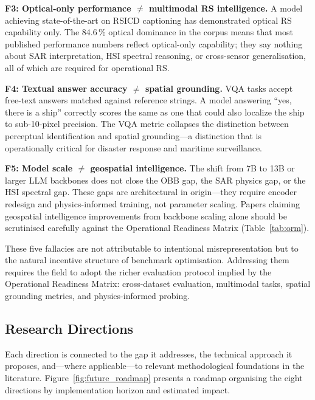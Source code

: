 \textbf{F3: Optical-only performance $\neq$ multimodal RS intelligence.}
A model achieving state-of-the-art on RSICD captioning has demonstrated optical
RS capability only. The 84.6\,\% optical dominance in the corpus means that most
published performance numbers reflect optical-only capability; they say nothing
about SAR interpretation, HSI spectral reasoning, or cross-sensor generalisation,
all of which are required for operational RS.

\textbf{F4: Textual answer accuracy $\neq$ spatial grounding.}
VQA tasks accept free-text answers matched against reference strings.
A model answering ``yes, there is a ship'' correctly scores the same as one that
could also localize the ship to sub-10-pixel precision. The VQA metric collapses
the distinction between perceptual identification and spatial grounding---a
distinction that is operationally critical for disaster response and maritime
surveillance.

\textbf{F5: Model scale $\neq$ geospatial intelligence.}
The shift from 7B to 13B or larger LLM backbones does not close the OBB gap,
the SAR physics gap, or the HSI spectral gap. These gaps are architectural in
origin---they require encoder redesign and physics-informed training, not parameter
scaling. Papers claiming geospatial intelligence improvements from backbone scaling
alone should be scrutinised carefully against the Operational Readiness Matrix
(Table~\ref{tab:orm}).

These five fallacies are not attributable to intentional misrepresentation but
to the natural incentive structure of benchmark optimisation. Addressing them
requires the field to adopt the richer evaluation protocol implied by the
Operational Readiness Matrix: cross-dataset evaluation, multimodal tasks,
spatial grounding metrics, and physics-informed probing.

\subsection{Research Directions}\label{sec9:directions}

Each direction is connected to the gap it addresses, the technical
approach it proposes, and---where applicable---to relevant methodological foundations
in the literature. Figure~\ref{fig:future_roadmap} presents
a roadmap organising the eight directions by implementation horizon and
estimated impact.


